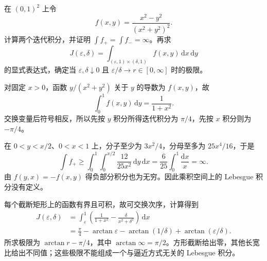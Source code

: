\begin{exercise}\label{b1:ex:07-corner-singularity}
在 \((0,1)^2\) 上令
\[
f(x,y)=\frac{x^2-y^2}{(x^2+y^2)^2}.
\]
计算两个迭代积分，并证明 \(\int f_+=\int f_-=\infty\)。再求
\[
J(\varepsilon,\delta)
=\int_{(\varepsilon,1)\times(\delta,1)}f(x,y)\,\mathrm{d}x\,\mathrm{d}y
\]
的显式表达式，确定当 \(\varepsilon,\delta\downarrow0\) 且 \(\varepsilon/\delta\rightarrow r\in[0,\infty]\) 时的极限。
\end{exercise}
\begin{solution}
对固定 \(x>0\)，函数 \(y/(x^2+y^2)\) 关于 \(y\) 的导数为 \(f(x,y)\)，故
\[
\int_0^1f(x,y)\,\mathrm{d}y=\frac1{1+x^2}.
\]
交换变量后符号相反，所以先按 \(y\) 积分所得迭代积分为 \(\pi/4\)，先按 \(x\) 积分则为 \(-\pi/4\)。

在 \(0<y<x/2\)、\(0<x<1\) 上，分子至少为 \(3x^2/4\)，分母至多为 \(25x^4/16\)，于是
\[
\int f_+\geq\int_0^1\int_0^{x/2}\frac{12}{25x^2}\,\mathrm{d}y\,\mathrm{d}x
=\frac6{25}\int_0^1\frac{\mathrm{d}x}{x}=\infty.
\]
由 \(f(y,x)=-f(x,y)\) 得负部分积分也为无穷。因此乘积空间上的 Lebesgue 积分没有定义。

每个截断矩形上的函数有界且可积，故可交换次序，计算得到
\begin{align*}
J(\varepsilon,\delta)
&=\int_\varepsilon^1\left(\frac1{1+x^2}-\frac{\delta}{x^2+\delta^2}\right)\,\mathrm{d}x\\
&=\frac\pi4-\arctan\varepsilon-\arctan(1/\delta)
+\arctan(\varepsilon/\delta).
\end{align*}
所求极限为 \(\arctan r-\pi/4\)，其中 \(\arctan\infty=\pi/2\)。方形截断给出零，其他长宽比给出不同值；这些极限不能组成一个与逼近方式无关的 Lebesgue 积分。
\end{solution}

